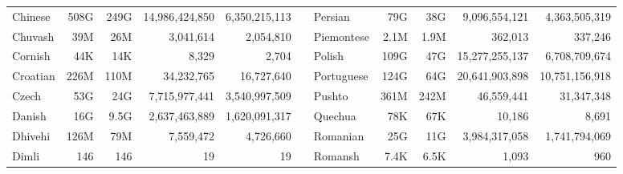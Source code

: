 \begin{table*}[t!]
{\begin{tabular}{@{}lrrrrclrrrr@{}}
            Chinese                   & 508G                     & 249G                      & 14,986,424,850           & 6,350,215,113             &                          & Persian                   & 79G                      & 38G                       & 9,096,554,121            & 4,363,505,319             \\
            Chuvash                   & 39M                      & 26M                       & 3,041,614                & 2,054,810                 &                          & Piemontese                & 2.1M                     & 1.9M                      & 362,013                  & 337,246                   \\
            Cornish                   & 44K                      & 14K                       & 8,329                    & 2,704                     &                          & Polish                    & 109G                     & 47G                       & 15,277,255,137           & 6,708,709,674             \\
            Croatian                  & 226M                     & 110M                      & 34,232,765               & 16,727,640                &                          & Portuguese                & 124G                     & 64G                       & 20,641,903,898           & 10,751,156,918            \\
            Czech                     & 53G                      & 24G                       & 7,715,977,441            & 3,540,997,509             &                          & Pushto                    & 361M                     & 242M                      & 46,559,441               & 31,347,348                \\
            Danish                    & 16G                      & 9.5G                      & 2,637,463,889            & 1,620,091,317             &                          & Quechua                   & 78K                      & 67K                       & 10,186                   & 8,691                     \\
            Dhivehi                   & 126M                     & 79M                       & 7,559,472                & 4,726,660                 &                          & Romanian                  & 25G                      & 11G                       & 3,984,317,058            & 1,741,794,069             \\
            Dimli                     & 146                      & 146                       & 19                       & 19                        &                          & Romansh                   & 7.4K                     & 6.5K                      & 1,093                    & 960                       \\

\end{tabular}}
\end{table*}
